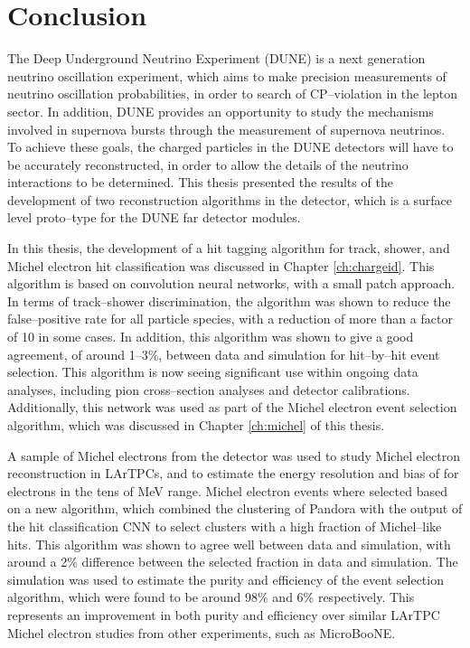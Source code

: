 \chapter{\label{ch:conclusion}Conclusion} 


\minitoc

The Deep Underground Neutrino Experiment (DUNE) is a next generation neutrino
oscillation experiment, which aims to make precision measurements of neutrino
oscillation probabilities, in order to search of CP--violation in the lepton
sector. In addition, DUNE provides an opportunity to study the mechanisms
involved in supernova bursts through the measurement of supernova neutrinos. 
To achieve these goals, the charged particles in the DUNE detectors will have to
be accurately reconstructed, in order to allow the details of the neutrino
interactions to be determined. This thesis presented the results of the
development of two reconstruction algorithms in the \protodune{} detector, which
is a surface level proto--type for the DUNE far detector modules. 

In this thesis, the development of a hit tagging algorithm for track, shower, 
and Michel electron hit classification was discussed in Chapter 
\ref{ch:chargeid}. This algorithm is based on convolution neural networks, 
with a small patch approach. In terms of track--shower discrimination, the 
algorithm was shown to reduce the false--positive rate for all particle 
species, with a reduction of more than a factor of 10 in some cases. In 
addition, this algorithm was shown to give a good agreement, of around 
1--3\%, between data and simulation for hit--by--hit event selection. This 
algorithm is now seeing significant use within ongoing \protodune{} data 
analyses, including pion cross--section analyses and detector calibrations. 
Additionally, this network was used as part of the Michel electron event 
selection algorithm, which was discussed in Chapter \ref{ch:michel} of this 
thesis.

A sample of Michel electrons from the \protodune{} detector was used to study
Michel electron reconstruction in LArTPCs, and to estimate the energy resolution
and bias of \protodune{} for electrons in the tens of MeV range. Michel electron
events where selected based on a new algorithm, which combined the clustering of
Pandora with the output of the hit classification CNN to select clusters with a
high fraction of Michel--like hits. This algorithm was shown to agree well
between data and simulation, with around a 2\% difference between the selected
fraction in data and simulation. The simulation was used to estimate the purity
and efficiency of the event selection algorithm, which were found to be around
98\% and 6\% respectively. This represents an improvement in both purity and
efficiency over similar LArTPC Michel electron studies from other experiments,
such as MicroBooNE.

